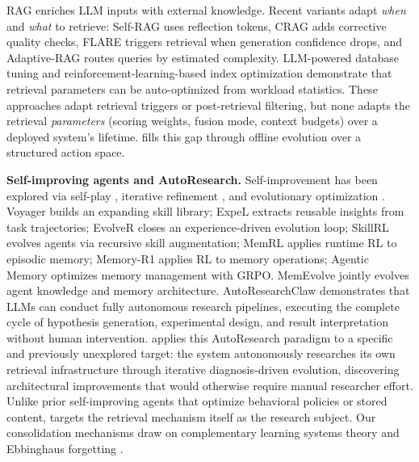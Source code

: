 RAG \citep{lewis2020retrieval, guu2020realm} enriches LLM inputs with external knowledge. Recent variants adapt \emph{when} and \emph{what} to retrieve: Self-RAG \citep{asai2024selfrag} uses reflection tokens, CRAG \citep{yan2024corrective} adds corrective quality checks, FLARE \citep{jiang2023active} triggers retrieval when generation confidence drops, and Adaptive-RAG \citep{jeong2024adaptiverag} routes queries by estimated complexity. LLM-powered database tuning \citep{giannakouris2025lambdatune} and reinforcement-learning-based index optimization \citep{wang2025litune} demonstrate that retrieval parameters can be auto-optimized from workload statistics. These approaches adapt retrieval triggers or post-retrieval filtering, but none adapts the retrieval \emph{parameters} (scoring weights, fusion mode, context budgets) over a deployed system's lifetime. \ours{} fills this gap through offline evolution over a structured action space.

\noindent \textbf{Self-improving agents and AutoResearch.}
Self-improvement has been explored via self-play \citep{chen2024self}, iterative refinement \citep{madaan2023self}, and evolutionary optimization \citep{gao2025survey}. Voyager \citep{wangvoyager} builds an expanding skill library; ExpeL \citep{zhao2024expel} extracts reusable insights from task trajectories; EvolveR \citep{wu2025evolver} closes an experience-driven evolution loop; SkillRL \citep{xia2026skillrl} evolves agents via recursive skill augmentation; MemRL \citep{zhang2026memrl} applies runtime RL to episodic memory; Memory-R1 \citep{liang2025memoryr1} applies RL to memory operations; Agentic Memory \citep{yu2026agenticmemory} optimizes memory management with GRPO. MemEvolve \citep{zhang2025memevolve} jointly evolves agent knowledge and memory architecture. AutoResearchClaw \citep{liu2026autoresearchclaw} demonstrates that LLMs can conduct fully autonomous research pipelines, executing the complete cycle of hypothesis generation, experimental design, and result interpretation without human intervention. \ours{} applies this AutoResearch paradigm to a specific and previously unexplored target: the system autonomously researches its own retrieval infrastructure through iterative diagnosis-driven evolution, discovering architectural improvements that would otherwise require manual researcher effort. Unlike prior self-improving agents that optimize behavioral policies or stored content, \ours{} targets the retrieval mechanism itself as the research subject. Our consolidation mechanisms draw on complementary learning systems theory \citep{mcclelland1995there} and Ebbinghaus forgetting \citep{ebbinghaus1885memory}.

